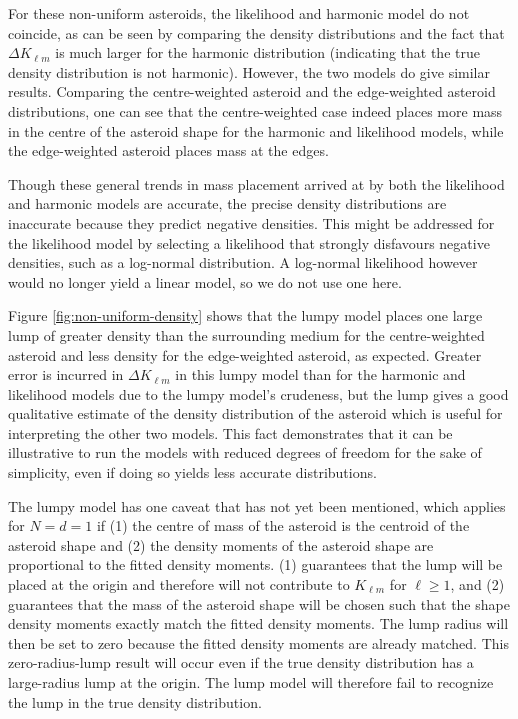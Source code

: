\documentclass[fleqn,usenatbib]{mnras}
\begin{document}
For these non-uniform asteroids, the likelihood and harmonic model do not coincide, as can be seen by comparing the density distributions and the fact that $\Delta K_{\ell m}$ is much larger for the harmonic distribution (indicating that the true density distribution is not harmonic). However, the two models do give similar results. Comparing the centre-weighted asteroid and the edge-weighted asteroid distributions, one can see that the centre-weighted case indeed places more mass in the centre of the asteroid shape for the harmonic and likelihood models, while the edge-weighted asteroid places mass at the edges.

Though these general trends in mass placement arrived at by both the likelihood and harmonic models are accurate, the precise density distributions are inaccurate because they predict negative densities. This might be addressed for the likelihood model by selecting a likelihood that strongly disfavours negative densities, such as a log-normal distribution. A log-normal likelihood however would no longer yield a linear model, so we do not use one here.

Figure \ref{fig:non-uniform-density} shows that the lumpy model places one large lump of greater density than the surrounding medium for the centre-weighted asteroid and less density for the edge-weighted asteroid, as expected. Greater error is incurred in $\Delta K_{\ell m}$ in this lumpy model than for the harmonic and likelihood models due to the lumpy model's crudeness, but the lump gives a good qualitative estimate of the density distribution of the asteroid which is useful for interpreting the other two models. This fact demonstrates that it can be illustrative to run the models with reduced degrees of freedom for the sake of simplicity, even if doing so yields less accurate distributions.


The lumpy model has one caveat that has not yet been mentioned, which applies for $N=d=1$ if (1) the centre of mass of the asteroid is the centroid of the asteroid shape and (2) the density moments of the asteroid shape are proportional to the fitted density moments. (1) guarantees that the lump will be placed at the origin and therefore will not contribute to $K_{\ell m}$ for $\ell \geq 1$, and (2) guarantees that the mass of the asteroid shape will be chosen such that the shape density moments exactly match the fitted density moments. The lump radius will then be set to zero because the fitted density moments are already matched. This zero-radius-lump result will occur even if the true density distribution has a large-radius lump at the origin. The lump model will therefore fail to recognize the lump in the true density distribution.
\end{document}
